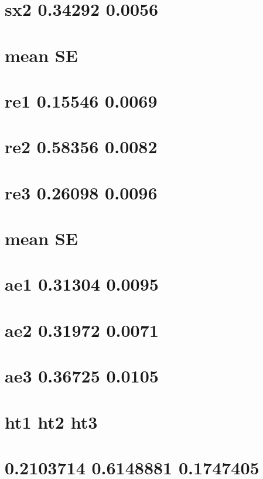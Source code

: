 \documentclass[]{book}
\theoremstyle{definition}
\theoremstyle{definition}
\theoremstyle{definition}
\theoremstyle{remark}
\begin{document}
\section{sx2 0.34292 0.0056}\label{sx2-0.34292-0.0056}

\section{mean SE}\label{mean-se-1}

\section{re1 0.15546 0.0069}\label{re1-0.15546-0.0069}

\section{re2 0.58356 0.0082}\label{re2-0.58356-0.0082}

\section{re3 0.26098 0.0096}\label{re3-0.26098-0.0096}

\section{mean SE}\label{mean-se-2}

\section{ae1 0.31304 0.0095}\label{ae1-0.31304-0.0095}

\section{ae2 0.31972 0.0071}\label{ae2-0.31972-0.0071}

\section{ae3 0.36725 0.0105}\label{ae3-0.36725-0.0105}

\section{ht1 ht2 ht3}\label{ht1-ht2-ht3}

\section{0.2103714 0.6148881 0.1747405}\label{section-54}
\end{document}
